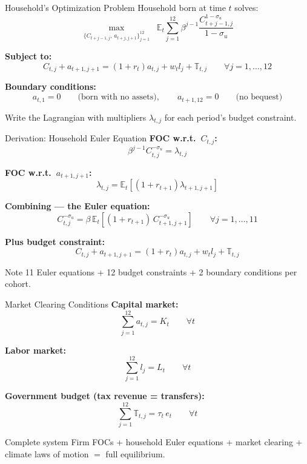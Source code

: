 \documentclass[aspectratio=169,11pt]{beamer}
\begin{document}
\begin{frame}{Household's Optimization Problem}
\small
Household born at time $t$ solves:
\[
\max_{\{C_{t+j-1,j},\, a_{t+j,j+1}\}_{j=1}^{12}} \;\; \mathbb{E}_t \sum_{j=1}^{12} \beta^{j-1} \frac{C_{t+j-1,j}^{1-\sigma_u}}{1-\sigma_u}
\]

\textbf{Subject to:}
\[
C_{t,j} + a_{t+1,j+1} = (1+r_t) a_{t,j} + w_t l_j + \mathbb{T}_{t,j} \qquad \forall j = 1, \ldots, 12
\]

\textbf{Boundary conditions:}
\[
a_{t,1} = 0 \qquad \text{(born with no assets)}, \qquad a_{t+1,12} = 0 \qquad \text{(no bequest)}
\]

\vspace{0.2cm}
Write the Lagrangian with multipliers $\lambda_{t,j}$ for each period's budget constraint.
\end{frame}

\begin{frame}{Derivation: Household Euler Equation}
\small
\textbf{FOC w.r.t.\ $C_{t,j}$:}
\[
\beta^{j-1} C_{t,j}^{-\sigma_u} = \lambda_{t,j}
\]

\textbf{FOC w.r.t.\ $a_{t+1,j+1}$:}
\[
\lambda_{t,j} = \mathbb{E}_t\left[(1+r_{t+1})\lambda_{t+1,j+1}\right]
\]

\textbf{Combining --- the Euler equation:}
\[
\boxed{C_{t,j}^{-\sigma_u} = \beta\, \mathbb{E}_t\!\left[(1+r_{t+1})\, C_{t+1,j+1}^{-\sigma_u}\right] \qquad \forall j = 1, \ldots, 11}
\]

\textbf{Plus budget constraint:}
\[
C_{t,j} + a_{t+1,j+1} = (1+r_t) a_{t,j} + w_t l_j + \mathbb{T}_{t,j}
\]

\vspace{0.1cm}
\begin{alertblock}{Note}
11 Euler equations + 12 budget constraints + 2 boundary conditions per cohort.
\end{alertblock}
\end{frame}

\begin{frame}{Market Clearing Conditions}
\small
\textbf{Capital market:}
\[
\sum_{j=1}^{12} a_{t,j} = K_t \qquad \forall t
\]

\textbf{Labor market:}
\[
\sum_{j=1}^{12} l_j = L_t \qquad \forall t
\]

\textbf{Government budget (tax revenue = transfers):}
\[
\sum_{j=1}^{12} \mathbb{T}_{t,j} = \tau_t\, e_t \qquad \forall t
\]

\vspace{0.2cm}
\begin{exampleblock}{Complete system}
Firm FOCs + household Euler equations + market clearing + climate laws of motion $=$ full equilibrium.
\end{exampleblock}
\end{frame}
\end{document}
